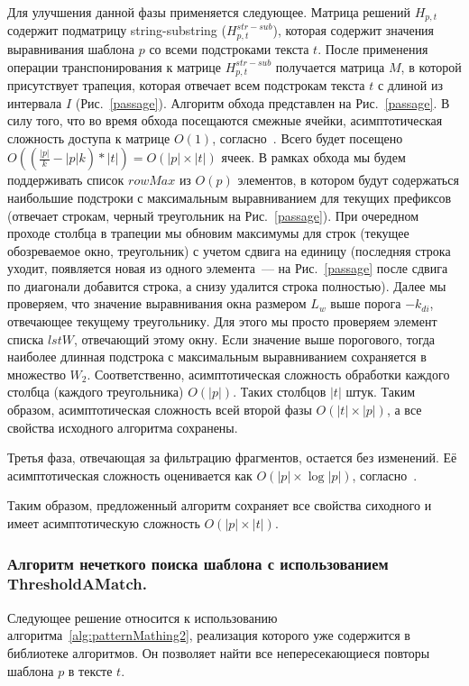 Для улучшения данной фазы применяется следующее.
Матрица решений $H_{p,t}$ содержит подматрицу string-substring ($H^{str-sub}_{p,t}$), которая содержит значения выравнивания шаблона $p$ со всеми подстроками текста $t$.
После применения операции транспонирования к матрице $H^{str-sub}_{p,t}$ получается матрица $M$, в которой присутствует трапеция, которая отвечает всем подстрокам текста $t$ с длиной из интервала $I$ (Рис.~\ref{passage}).
Алгоритм обхода представлен на Рис.~\ref{passage}.
В силу того, что во время обхода посещаются смежные ячейки, асимптотическая сложность доступа к матрице $O(1)$, согласно~\cite{tiskin2008semi}.
Всего будет посещено $O((\frac{|p|}{k}-|p|k)*|t|)=O(|p|\times|t|)$ ячеек.
В рамках обхода мы будем поддерживать список $rowMax$ из $O(p)$ элементов, в котором будут содержаться наибольшие подстроки с максимальным выравниванием для текущих префиксов (отвечает строкам, черный треугольник на Рис.~\ref{passage}).
При очередном проходе столбца в трапеции мы обновим максимумы для строк (текущее обозреваемое окно, треугольник) с учетом сдвига на единицу (последняя строка уходит, появляется новая из одного элемента~--- на Рис.~\ref{passage} после сдвига по диагонали добавится строка, а снизу удалится строка полностью).
Далее мы проверяем, что значение выравнивания окна размером $L_{w}$ выше порога $-k_{di}$, отвечающее текущему треугольнику.
Для этого мы просто проверяем элемент списка $lstW$, отвечающий этому окну.
Если значение выше порогового, тогда наиболее длинная подстрока с максимальным выравниванием сохраняется в множество $W_{2}$.
Соответственно, асимптотическая сложность обработки каждого столбца (каждого треугольника) $O(|p|)$.
Таких столбцов $|t|$ штук.
Таким образом, асимптотическая сложность всей второй фазы $O(|t| \times |p|)$, а все свойства исходного алгоритма сохранены.

Третья фаза, отвечающая за фильтрацию фрагментов, остается без изменений.
Её асимптотическая сложность оценивается как $O(|p| \times \log |p|)$, согласно~\cite{luciv2019interactive}.

Таким образом, предложенный алгоритм сохраняет все свойства сиходного и имеет асимптотическую сложность $O(|p| \times |t|)$.


\subsubsection{Алгоритм нечеткого поиска шаблона с использованием ThresholdAMatch.}
Следующее решение относится к использованию алгоритма~\ref{alg:patternMathing2}, реализация которого уже содержится в библиотеке алгоритмов.
Он позволяет найти все непересекающиеся повторы шаблона $p$ в тексте $t$.

